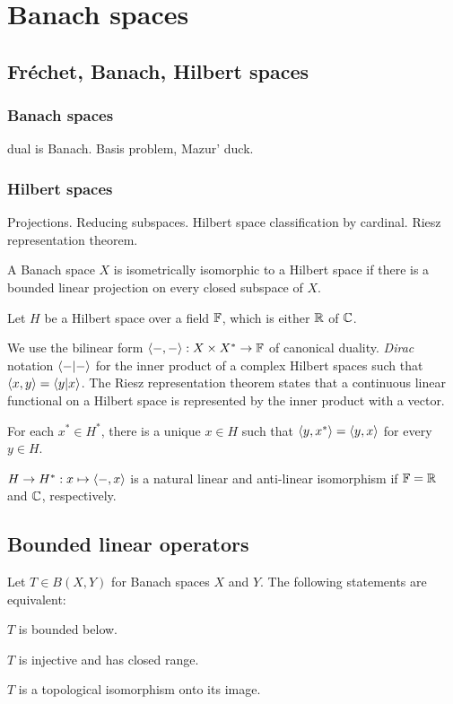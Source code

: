 \documentclass{../note}
\begin{document}
\part{Banach spaces}

\chapter{Fr\'echet, Banach, Hilbert spaces}

\section{Banach spaces}
dual is Banach.
Basis problem, Mazur' duck.

\section{Hilbert spaces}
Projections. Reducing subspaces.
Hilbert space classification by cardinal.
Riesz representation theorem.
\begin{prb}
\begin{parts}
\item A Banach space $X$ is isometrically isomorphic to a Hilbert space if there is a bounded linear projection on every closed subspace of $X$.
\end{parts}
\end{prb}

\begin{prb}
Let $H$ be a Hilbert space over a field $\mathbb{F}$, which is either $\mathbb{R}$ of $\mathbb{C}$.


We use the bilinear form $\langle-,-\rangle:X\times X^*\to\mathbb{F}$ of canonical duality.
\emph{Dirac} notation $\langle-|-\rangle$ for the inner product of a complex Hilbert spaces such that $\langle x,y\rangle=\langle y|x\rangle$.
The Riesz representation theorem states that a continuous linear functional on a Hilbert space is represented by the inner product with a vector.
\begin{parts}
\item For each $x^*\in H^*$, there is a unique $x\in H$ such that $\langle y,x^*\rangle=\langle y,x\rangle$ for every $y\in H$.
\item $H\to H^*:x\mapsto\langle-,x\rangle$ is a natural linear and anti-linear isomorphism if $\mathbb{F}=\mathbb{R}$ and $\mathbb{C}$, respectively.
\end{parts}
\end{prb}



\chapter{Bounded linear operators}
\begin{prb}
Let $T\in B(X,Y)$ for Banach spaces $X$ and $Y$.
The following statements are equivalent:
\begin{parts}
\item $T$ is bounded below.
\item $T$ is injective and has closed range.
\item $T$ is a topological isomorphism onto its image.
\end{parts}
\end{prb}
\end{document}

